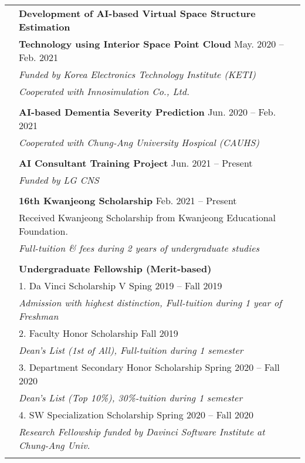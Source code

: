 \documentclass[letterpaper, 11pt]{article}
\begin{document}
\begin{longtable}{p{1.3in}p{4.8in}}
& {\textbf{Development of AI-based Virtual Space Structure Estimation}} \\
& {\textbf{Technology using Interior Space Point Cloud}} \hfill May. 2020 -- Feb. 2021 \\
& {\it Funded by Korea Electronics Technology Institute (KETI)} \\
& {\it Cooperated with Innosimulation Co., Ltd. } \\
& \\
 
& {\textbf{AI-based Dementia Severity Prediction}} \hfill Jun. 2020 -- Feb. 2021 \\
& {\it Cooperated with Chung-Ang University Hospical (CAUHS)}  \\
& \\
 
& {\textbf{AI Consultant Training Project}} \hfill Jun. 2021 -- Present \\
& {\it Funded by LG CNS} \\
& \\


{\color{OliveGreen}{Honors and }} 
& \textbf{16th Kwanjeong Scholarship} \hfill Feb. 2021 -- Present \\
{\color{OliveGreen}{Scholarship}} 
& Received Kwanjeong Scholarship from Kwanjeong Educational Foundation. \\
& {\it Full-tuition \& fees during 2 years of undergraduate studies} \\
\\

& \textbf{Undergraduate Fellowship (Merit-based)} \\
& \setlength{\leftskip}{10pt} 1. Da Vinci Scholarship V \hfill Sping 2019 -- Fall 2019\\
& \setlength{\leftskip}{10pt} {\it Admission with highest distinction, Full-tuition during 1 year of Freshman} \\
& \setlength{\leftskip}{10pt} 2. Faculty Honor Scholarship \hfill Fall 2019 \\
& \setlength{\leftskip}{10pt} {\it Dean's List (1st of All), Full-tuition during 1 semester} \\
& \setlength{\leftskip}{10pt} 3. Department Secondary Honor Scholarship \hfill Spring 2020 -- Fall 2020\\
& \setlength{\leftskip}{10pt} {\it Dean's List (Top 10\%), 30\%-tuition during 1 semester} \\
& \setlength{\leftskip}{10pt} 4. SW Specialization Scholarship \hfill Spring 2020 -- Fall 2020\\
& \setlength{\leftskip}{10pt} {\it Research Fellowship funded by Davinci Software Institute at Chung-Ang Univ.} \\
\\


\end{longtable}
\end{document}
